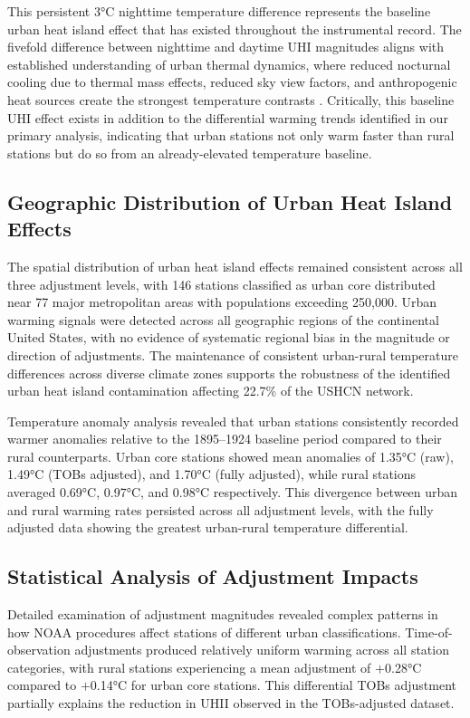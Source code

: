 \documentclass[11pt, a4paper]{article}
\begin{document}
This persistent 3°C nighttime temperature difference represents the baseline urban heat island effect that has existed throughout the instrumental record. The fivefold difference between nighttime and daytime UHI magnitudes aligns with established understanding of urban thermal dynamics, where reduced nocturnal cooling due to thermal mass effects, reduced sky view factors, and anthropogenic heat sources create the strongest temperature contrasts \parencite{oke1987boundary}. Critically, this baseline UHI effect exists in addition to the differential warming trends identified in our primary analysis, indicating that urban stations not only warm faster than rural stations but do so from an already-elevated temperature baseline.

\subsection{Geographic Distribution of Urban Heat Island Effects}

The spatial distribution of urban heat island effects remained consistent across all three adjustment levels, with 146 stations classified as urban core distributed near 77 major metropolitan areas with populations exceeding 250,000. Urban warming signals were detected across all geographic regions of the continental United States, with no evidence of systematic regional bias in the magnitude or direction of adjustments. The maintenance of consistent urban-rural temperature differences across diverse climate zones supports the robustness of the identified urban heat island contamination affecting 22.7\% of the USHCN network.

Temperature anomaly analysis revealed that urban stations consistently recorded warmer anomalies relative to the 1895--1924 baseline period compared to their rural counterparts. Urban core stations showed mean anomalies of 1.35°C (raw), 1.49°C (TOBs adjusted), and 1.70°C (fully adjusted), while rural stations averaged 0.69°C, 0.97°C, and 0.98°C respectively. This divergence between urban and rural warming rates persisted across all adjustment levels, with the fully adjusted data showing the greatest urban-rural temperature differential.

\subsection{Statistical Analysis of Adjustment Impacts}

Detailed examination of adjustment magnitudes revealed complex patterns in how NOAA procedures affect stations of different urban classifications. Time-of-observation adjustments produced relatively uniform warming across all station categories, with rural stations experiencing a mean adjustment of $+$0.28°C compared to $+$0.14°C for urban core stations. This differential TOBs adjustment partially explains the reduction in UHII observed in the TOBs-adjusted dataset.
\end{document}
